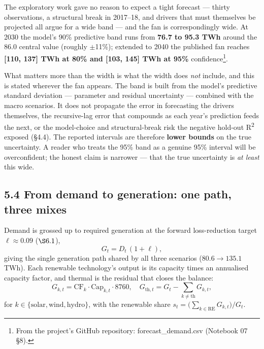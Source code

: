 \documentclass[10pt,twocolumn]{article}
\begin{document}
The exploratory work gave no reason to expect a tight forecast --- thirty observations, a structural break in 2017--18, and drivers that must themselves be projected all argue for a wide band --- and the fan is correspondingly wide. At 2030 the model's 90\% predictive band runs from \textbf{76.7 to 95.3 TWh} around the 86.0 central value (roughly $\pm$11\%); extended to 2040 the published fan reaches \textbf{[110, 137] TWh at 80\% and [103, 145] TWh at 95\%} confidence\footnote{From the project's GitHub repository: forecast\_demand.csv (Notebook 07 \S{}8).}.

What matters more than the width is what the width does \textit{not} include, and this is stated wherever the fan appears. The band is built from the model's predictive standard deviation --- parameter and residual uncertainty --- combined with the macro scenarios. It does not propagate the error in forecasting the drivers themselves, the recursive-lag error that compounds as each year's prediction feeds the next, or the model-choice and structural-break risk the negative hold-out R\textsuperscript{2} exposed (\S{}4.4). The reported intervals are therefore \textbf{lower bounds} on the true uncertainty. A reader who treats the 95\% band as a genuine 95\% interval will be overconfident; the honest claim is narrower --- that the true uncertainty is \textit{at least} this wide.

\subsection*{5.4 From demand to generation: one path, three mixes}

\noindent Demand is grossed up to required generation at the forward
loss-reduction target $\ell\approx0.09$ ($\S6.1$),
\begin{equation}
G_t=D_t\,(1+\ell),
\label{eq:gross}
\end{equation}
giving the single generation path shared by all three scenarios
($80.6\rightarrow135.1$ TWh). Each renewable technology's output is its capacity
times an annualised capacity factor, and thermal is the residual that closes the
balance:
\begin{equation}
G_{k,t}=\mathrm{CF}_k\cdot \mathrm{Cap}_{k,t}\cdot 8760,\quad
G_{\mathrm{th},t}=G_t-\!\!\sum_{k\neq\mathrm{th}}\!\! G_{k,t},
\label{eq:mix}
\end{equation}
for $k\in\{\text{solar},\text{wind},\text{hydro}\}$, with the renewable share
$s_t=\bigl(\sum_{k\in\mathrm{RE}}G_{k,t}\bigr)/G_t$.
\end{document}
